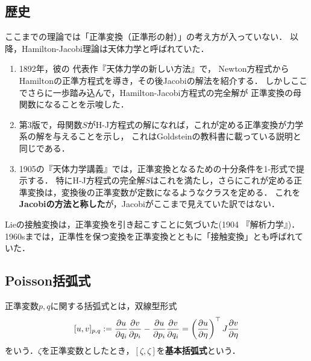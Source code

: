\documentclass[uplatex, dvipdfmx]{jsreport}
\begin{document}
\subsection{歴史}

\begin{tcolorbox}[colframe=ForestGreen, colback=ForestGreen!10!white,breakable,colbacktitle=ForestGreen!40!white,coltitle=black,fonttitle=\bfseries\sffamily,
    title=]
    ここまでの理論では「正準変換（正準形の射）」の考え方が入っていない．
    以降，Hamilton-Jacobi理論は天体力学と呼ばれていた．
\end{tcolorbox}

\begin{history}[Poincareの正準変換の研究]\mbox{}
    \begin{enumerate}
        \item 1892年，彼の
        代表作『天体力学の新しい方法』\cite{Poincare1892}で，
        Newton方程式からHamiltonの正準方程式を導き，その後Jacobiの解法を紹介する．
        しかしここでさらに一歩踏み込んで，Hamilton-Jacobi方程式の完全解が
        正準変換の母関数になることを示唆した．
        \item 第3版で，母関数$S$がH-J方程式の解になれば，これが定める正準変換が力学系の解を与えることを示し，
        これはGoldsteinの教科書に載っている説明と同じである．
        \item 1905の『天体力学講義』\cite{Poincare1905}では，正準変換となるための十分条件を1-形式で提示する．
        特にH-J方程式の完全解$S$はこれを満たし，さらにこれが定める正準変換は，変換後の正準変数が定数になるようなクラスを定める．
        これを\textbf{Jacobiの方法と称した}が，Jacobiがここまで見えていた訳ではない．
    \end{enumerate}
\end{history}

\begin{history}
    Lieの接触変換は，正準変換を引き起こすことに気づいた(1904 『解析力学』)．
    1960sまでは，正準性を保つ変換を正準変換とともに「接触変換」とも呼ばれていた．
\end{history}

\subsection{Poisson括弧式}

\begin{definition}
    正準変数$p,q$に関する括弧式とは，双線型形式
    \[[u,v]_{p,q}:=\frac{\partial u}{\partial q_i}\frac{\partial v}{\partial p_i}-\frac{\partial u}{\partial p_i}\frac{\partial v}{\partial q_i}=\left(\frac{\partial u}{\partial \eta}\right)^\top J\frac{\partial v}{\partial \eta}\]
    をいう．$\zeta$を正準変数としたとき，$[\zeta,\zeta]$を\textbf{基本括弧式}という．
\end{definition}
\end{document}
